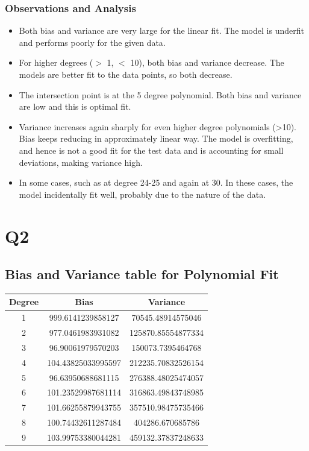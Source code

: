 \documentclass{article}
\begin{document}
\subsubsection{Observations and Analysis}
\begin{itemize}
\item Both bias and variance are very large for the linear fit. The model is underfit and performs poorly for the given data.
\item For higher degrees ($>$ 1, $<$ 10), both bias and variance decrease. The models are better fit to the data points, so both decrease.
\item The intersection point is at the 5 degree polynomial. Both bias and variance are low and this is optimal fit.
\item Variance increases again sharply for even higher degree polynomials (>10). Bias keeps reducing in approximately linear way. The model is overfitting, and hence is not a good fit for the test data and is accounting for small deviations, making variance high. 
\item In some cases, such as at degree 24-25 and again at 30. In these cases, the model incidentally fit well, probably due to the nature of the data.
\end{itemize}

\section{Q2}
\subsection{Bias and Variance table for Polynomial Fit}
\begin{center}
\begin{tabular}{ | c | c | c | }
\hline
Degree & Bias & Variance \\
\hline
1 & 999.6141239858127 & 70545.48914575046 \\
\hline
2 & 977.0461983931082 & 125870.85554877334 \\
\hline
3 & 96.90061979570203 & 150073.7395464768 \\
\hline
4 & 104.43825033995597 & 212235.70832526154 \\
\hline
5 & 96.63950688681115 & 276388.48025474057 \\
\hline
6 & 101.23529987681114 & 316863.49843748985 \\
\hline
7 & 101.66255879943755 & 357510.98475735466 \\
\hline
8 & 100.74432611287484 & 404286.670685786 \\
\hline
9 & 103.99753380044281 & 459132.37837248633 \\
\hline
\end{tabular}
\end{center}
\end{document}
